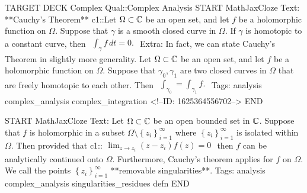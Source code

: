 \documentclass{memoir}
\begin{document}
\begin{anki}
TARGET DECK
Complex Qual::Complex Analysis
START
MathJaxCloze
Text: **Cauchy's Theorem**
{{c1::Let \(\Omega \subset \mathbb{C}\) be an open set, and let \(f\) be a holomorphic function on \(\Omega \). Suppose that \(\gamma \) is a smooth closed curve in \(\Omega \). If \(\gamma \) is homotopic to a constant curve, then
      \(\begin{align*}
        	\int_\gamma f \,d t = 0.
        \end{align*}\)}} 
Extra: In fact, we can state Cauchy's Theorem in slightly more generality.
Let \(\Omega \subset \mathbb{C}\) be an open set, and let \(f\) be a holomorphic function on \(\Omega \). Suppose that \(\gamma_0,\gamma_1\) are two closed curves in \(\Omega \) that are freely homotopic to each other. Then
\(\begin{align*}
  	\int_{\gamma_0} = \int_{\gamma_1}f.
  \end{align*}\)
Tags: analysis complex_analysis complex_integration
<!--ID: 1625364556702-->
END
\end{anki}

\begin{anki}
START
MathJaxCloze
Text: Let \(\Omega \subset \mathbb{C}\) be an open bounded set in \(\mathbb{C}\). Suppose that \(f\) is holomorphic in a subset \(\Omega \setminus \left\{ z_i \right\}_{i=1}^{\infty}\) where \(\left\{ z_i \right\}_{i=1}^{\infty}\) is isolated within \(\Omega \). Then provided that
 {{c1::\(\begin{align*}
         	\lim_{z \to z_i} (z-z_i)f(z) = 0
         \end{align*}\)}} 
	then \(f\) can be analytically continued onto \(\Omega \). Furthermore, Cauchy's theorem applies for \(f\) on \(\Omega \). We call the points \(\left\{ z_i \right\}_{i=1}^{\infty}\) **removable singularities**.
Tags: analysis complex_analysis singularities_residues defn
END
\end{anki}
\end{document}
